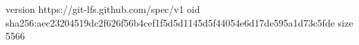 version https://git-lfs.github.com/spec/v1
oid sha256:aec23204519dc2f626f56b4cef1f5d5d1145d5f44054e6d17de595a1d73c5fde
size 5566

